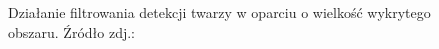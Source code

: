 \begin{itemize}
\begin{figure}[!h]
\begin{center}
        \end{center}
        \caption{Działanie filtrowania detekcji twarzy w oparciu o wielkość wykrytego obszaru. Źródło zdj.: \cite{readheadPortrait1}}
        \label{fig:face_size}
    \end{figure}
    
    
    
\end{itemize}
